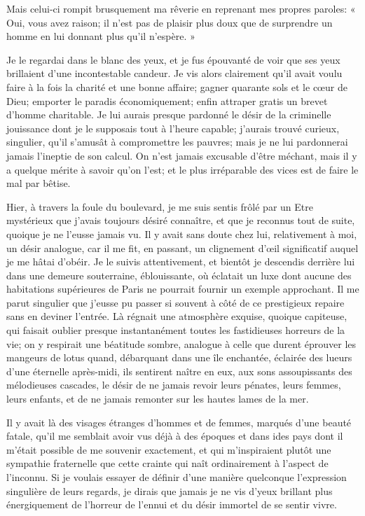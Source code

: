 Mais celui{}-ci rompit brusquement ma rêverie en reprenant mes propres
paroles: « Oui, vous avez raison; il n’est pas de
plaisir plus doux que de surprendre un homme en lui donnant plus
qu’il n’espère. »

Je le regardai dans le blanc des yeux, et je fus épouvanté de voir que
ses yeux brillaient d’une incontestable candeur. Je
vis alors clairement qu’il avait voulu faire à la fois
la charité et une bonne affaire; gagner quarante sols et le c\oe ur de
Dieu; emporter le paradis économiquement; enfin attraper gratis un
brevet d’homme charitable. Je lui aurais presque
pardonné le désir de la criminelle jouissance dont je le supposais tout
à l’heure capable; j’aurais trouvé
curieux, singulier, qu’il s’amusât à
compromettre les pauvres; mais je ne lui pardonnerai jamais
l’ineptie de son calcul. On n’est
jamais excusable d’être méchant, mais il y a quelque
mérite à savoir qu’on l’est; et le
plus irréparable des vices est de faire le mal par bêtise. 


Hier, à travers la foule du boulevard, je me suis sentis frôlé par un
Etre mystérieux que j’avais toujours désiré connaître,
et que je reconnus tout de suite, quoique je ne
l’eusse jamais vu. Il y avait sans doute chez lui,
relativement à moi, un désir analogue, car il me fit, en passant, un
clignement d’\oe il significatif auquel je me hâtai
d’obéir. Je le suivis attentivement, et bientôt je
descendis derrière lui dans une demeure souterraine, éblouissante, où
éclatait un luxe dont aucune des habitations supérieures de Paris ne
pourrait fournir un exemple approchant. Il me parut singulier que
j’eusse pu passer si souvent à côté de ce prestigieux
repaire sans en deviner l’entrée. Là régnait une
atmosphère exquise, quoique capiteuse, qui faisait oublier presque
instantanément toutes les fastidieuses horreurs de la vie; on y
respirait une béatitude sombre, analogue à celle que durent éprouver
les mangeurs de lotus quand, débarquant dans une île enchantée,
éclairée des lueurs d’une éternelle après{}-midi, ils
sentirent naître en eux, aux sons assoupissants des mélodieuses
cascades, le désir de ne jamais revoir leurs pénates, leurs femmes,
leurs enfants, et de ne jamais remonter sur les hautes lames de la mer.

Il y avait là des visages étranges d’hommes et de
femmes, marqués d’une beauté fatale,
qu’il me semblait avoir vus déjà à des époques et dans
ides pays dont il m’était possible de me souvenir
exactement, et qui m’inspiraient plutôt une sympathie
fraternelle que cette crainte qui naît ordinairement à
l’aspect de l’inconnu. Si je voulais
essayer de définir d’une manière quelconque
l’expression singulière de leurs regards, je dirais
que jamais je ne vis d’yeux brillant plus
énergiquement de l’horreur de l’ennui
et du désir immortel de se sentir vivre.


